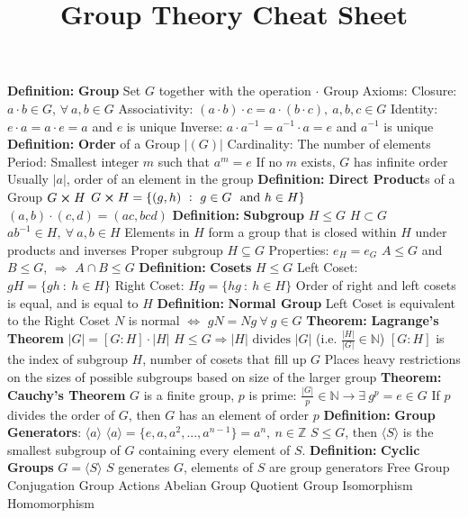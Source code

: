 \documentclass[14pt]{extarticle}
\title{Group Theory Cheat Sheet}
\def\Definition{{\color{blue} \textbf{Definition:} }}
\def\Theorem{{\color{red} \textbf{Theorem:} }}
\begin{document}
	\maketitle
	\begin{outline}		
		\1	\Definition \textbf{Group}
			\2	Set $G$ together with the operation $\cdot$
			\2	Group Axioms:
				\3	Closure:	$a \cdot b \in G$, $\forall~a,b \in G$
				\3	Associativity:	$(a \cdot b) \cdot c = a \cdot (b \cdot c),~a,b,c \in G$
				\3	Identity:	$e \cdot a = a \cdot e = a$ and $e$ is unique
				\3	Inverse: $a \cdot a^{-1} = a^{-1} \cdot a = e$ and $a^{-1}$ is unique
		\1	\Definition \textbf{Order} of a Group $|(G)|$
			\2	Cardinality:	The number of elements
			\2	Period:	Smallest integer $m$ such that $a^m = e$
				\3	If no $m$ exists, $G$ has infinite order
				\3	Usually $|a|$, order of an element in the group
		\1	\Definition \textbf{Direct Product}s of a Group $G \cross H$
			\2	$G \cross H = \{(g,h)~:~g \in G~\text{ and } h \in H\}$
			\2	$(a,b) \cdot (c,d) = (ac,bcd)$
		\1	\Definition \textbf{Subgroup} $H \le G$
			\2	$H \subset G$
			\2	$ab^{-1} \in H,~\forall~a,b \in H$
			\2	Elements in $H$ form a group that is closed within $H$ under products and inverses
			\2	Proper subgroup $H \subseteq G$
			\2	Properties:
				\3	$e_H = e_G$
				\3	$A \le G$ and $B \le G$, $\Rightarrow$ $A \cap B \le G$
		\1	\Definition \textbf{Cosets}
			\2	$H \le G$
			\2	Left Coset:	 $gH = \{gh~:~h \in H\}$
			\2	Right Coset: $Hg = \{hg~:~h \in H\}$	
			\2	Order of right and left cosets is equal, and is equal to $H$
		\1	\Definition \textbf{Normal Group}
			\2	Left Coset is equivalent to the Right Coset
			\2	$N$ is normal $\Leftrightarrow$ $gN = Ng~\forall~g \in G$
		\1	\Theorem \textbf{Lagrange's Theorem}
			\2	$|G| = [G:H] \cdot |H|$
			\2	$H \le G \Rightarrow |H| \text{ divides } |G|$ (i.e. $\frac{|H|}{|G|} \in \mathbb{N}$)
			\2	$[G : H]$ is the index of subgroup $H$, number of cosets that fill
					up $G$
			\2	Places heavy restrictions on the sizes of possible subgroups based
					on size of the larger group
		\1	\Theorem \textbf{Cauchy's Theorem}
			\2	$G$ is a finite group, $p$ is prime: $\frac{|G|}{p} \in \mathbb{N} \rightarrow \exists~g^p = e \in G$
			\2	If $p$ divides the order of $G$, then $G$ has an element of order $p$
		\1	\Definition \textbf{Group Generators}: $\langle a \rangle$
			\2	$\langle a \rangle = \{e,a,a^2,...,a^{n-1}\} = a^n,~n \in \mathbb{Z}$
			\2	$S \le G$, then $\langle S \rangle$ is the smallest subgroup of $G$ containing
					every element of $S$.
		\1	\Definition \textbf{Cyclic Groups}
			\2	$G = \langle S \rangle$
			\2	$S$ generates $G$, elements of $S$ are group generators
		\1	Free Group	
		\1	Conjugation
		\1	Group Actions
		\1	Abelian Group
		\1	Quotient Group
		\1	Isomorphism
		\1	Homomorphism

	\end{outline}
\end{document}

